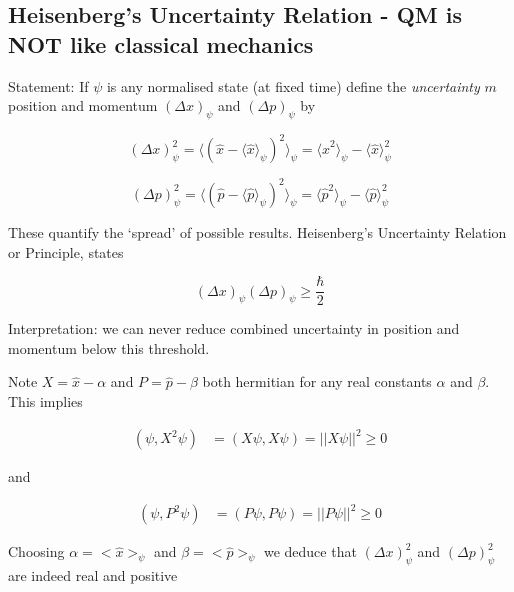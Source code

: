 \documentclass[a4paper]{article}
\begin{document}
 
\subsection{Heisenberg's Uncertainty Relation - QM is NOT like classical mechanics}





Statement: If $ \psi $ is any normalised state (at fixed time) define the \emph{uncertainty} $ m $ position and momentum $ (\Delta x)_{\psi} $ and $ (\Delta p)_{\psi} $ by

\[ (\Delta x)_{\psi}^{2} = \langle (\hat{x}  - \langle \hat{x} \rangle_{\psi} )^{2} \rangle_{\psi} = \langle \hat{x}^{2} \rangle_{\psi} - \langle \hat{x} \rangle_{\psi}^{2} \]

\[ (\Delta p)_{\psi}^{2} = \langle (\hat{p}  - \langle \hat{p} \rangle_{\psi} )^{2} \rangle_{\psi} = \langle \hat{p}^{2} \rangle_{\psi} - \langle \hat{p} \rangle_{\psi}^{2} \]

These quantify the `spread' of possible results. Heisenberg's Uncertainty Relation or Principle, states

\[ (\Delta x)_{\psi} (\Delta p)_{\psi} \geq \frac{\hbar}{2} \]

Interpretation: we can never reduce combined uncertainty in position and momentum below this threshold. 


Note $ X = \hat{x} - \alpha $ and $ P = \hat{p} - \beta $ both hermitian for any real constants $ \alpha $ and $ \beta $. This implies 

\begin{align*}
(\psi, X^{2}\psi)& = (X\psi, X\psi)  = | | X \psi | |^{2} \geq 0
\end{align*}

and 

\begin{align*}
(\psi, P^{2}\psi)& = (P\psi, P\psi)  = | | P \psi | |^{2} \geq 0
\end{align*}

Choosing $ \alpha = <\hat{x}>_{\psi} $ and $ \beta = <\hat{p}>_{\psi} $ we deduce that $ (\Delta x)_{\psi}^{2}  $ and $ (\Delta p)_{\psi}^{2} $ are indeed real and positive
\end{document}
